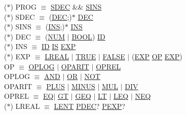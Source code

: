 \documentclass[\main/MemoriaPL.tex]{subfiles}
\begin{document}
    \vspace{2mm}
    \hspace{5mm}($\ast$) PROG $\equiv$ \underline{SDEC} \&\& \underline{SINS} \\
    \vspace{2mm}
    \hspace{5mm}($\ast$) SDEC $\equiv$ (\underline{DEC};)$\ast$ \underline{DEC} \\
    \vspace{2mm}
    \hspace{5mm}($\ast$) SINS $\equiv$ (\underline{INS};)$\ast$ \underline{INS} \\
    \vspace{2mm}
    \hspace{5mm}($\ast$) DEC $\equiv$ (\underline{NUM} $\mid$ \underline{BOOL}) \underline{ID} \\
    \vspace{2mm}
    \hspace{5mm}($\ast$) INS $\equiv$ \underline{ID} \underline{IS} \underline{EXP} \\
    \vspace{2mm}
    \hspace{5mm}($\ast$) EXP $\equiv$ \underline{LREAL} $\mid$ \underline{TRUE} $\mid$ \underline{FALSE} $\mid$ (\underline{EXP} \underline{OP} \underline{EXP}) \\
    \vspace{2mm}
    \hspace{10mm} OP $\equiv$ \underline{OPLOG} $\mid$ \underline{OPARIT} $\mid$ \underline{OPREL} \\
    \vspace{2mm}
    \hspace{10mm} OPLOG $\equiv$ \underline{AND} $\mid$ \underline{OR} $\mid$ \underline{NOT} \\
    \vspace{2mm}
    \hspace{10mm} OPARIT $\equiv$ \underline{PLUS} $\mid$ \underline{MINUS} $\mid$ \underline{MUL} $\mid$ \underline{DIV} \\
    \vspace{2mm}
    \hspace{10mm} OPREL $\equiv$ \underline{EQ}$\mid$ \underline{GT} $\mid$ \underline{GEQ} $\mid$ \underline{LT} $\mid$ \underline{LEQ} $\mid$ \underline{NEQ} \\
    \vspace{2mm}
    \hspace{5mm}($\ast$) LREAL $\equiv$ \underline{LENT} \underline{PDEC}? \underline{PEXP}? \\
\end{document}

